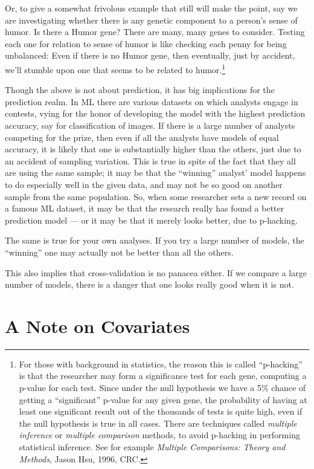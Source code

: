 Or, to give a somewhat frivolous example that still will make the point,
say we are investigating whether there is any genetic component to a
person's sense of humor.  Is there a Humor gene?  There are many, many
genes to consider.  Testing each one for relation to sense of humor is
like checking each penny for being unbalanced: Even if there is no Humor
gene, then eventually, just by accident, we'll stumble upon one that
seems to be related to humor.\footnote{For those with background in
statistics, the reason this is called ``p-hacking'' is that the
researcher may form a significance test for each gene, computing a
p-value for each test.  Since under the null hypothesis we have a 5\%
chance of getting a ``significant'' p-value for any given gene, the
probability of having at least one significant result out of the
thousands of tests is quite high, even if the null hypothesis is true in
all cases.  There are techniques called \textit{multiple inference} or
\textit{multiple comparison} methods, to avoid p-hacking in performing
statistical inference.  See for example \textit{Multiple Comparisons:
Theory and Methods}, Jason Hsu, 1996, CRC.}

Though the above is not about prediction, it has big implications for
the prediction realm.  In ML there are various datasets on which
analysts engage in contests, vying for the honor of developing the model
with the highest prediction accuracy, say for classification of images.
If there is a large number of analysts competing for the prize, then
even if all the analysts have models of equal accuracy, it is likely
that one is substantially higher than the others, just due to an
accident of sampling variation.  This is true in spite of the fact that
they all are using the same sample; it may be that the ``winning''
analyst' model happens to do especially well in the given data, and may
not be so good on another sample from the same population.  So, when some
researcher sets a new record on a famous ML dataset, it may be that the
research really has found a better prediction model --- or it may be
that it merely looks better, due to p-hacking.

The same is true for your own analyses.  If you try a large number of
models, the ``winning'' one may actually not be better than all the
others.

This also implies that cross-validation is no panacea either.  If we
compare a large number of models, there is a danger that one looks
really good when it is not.

\section{A Note on Covariates}

